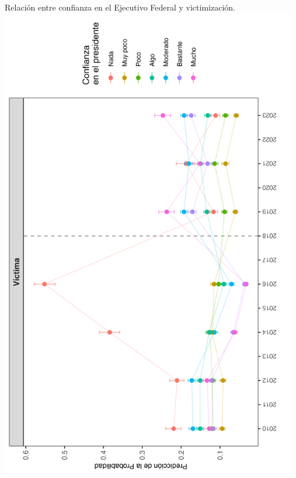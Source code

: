 \documentclass[letterpaper]{article}
\begin{document}
\begin{center}
Relación entre confianza en el Ejecutivo Federal y victimización.
\includegraphics[width = 13cm]{plot_pres_02.png}
    \label{tab:plot3}
\end{center}

\newpage
\end{document}
